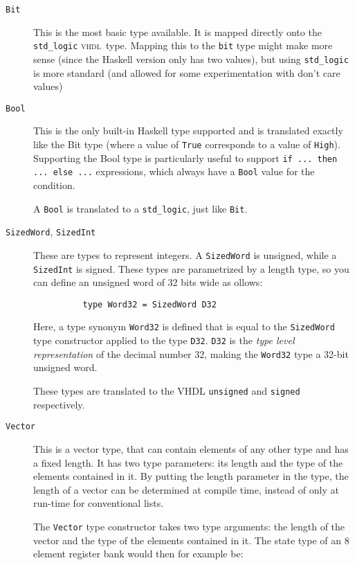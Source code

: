 \documentclass[conference,pdf,a4paper,10pt,final,twoside,twocolumn]{IEEEtran}
\def\VHDL{\textsc{vhdl}}
\def\hs#1{\texttt{#1}}
\begin{document}
    \begin{description}
      \item[\hs{Bit}]
        This is the most basic type available. It is mapped directly onto
        the \texttt{std\_logic} \VHDL\ type. Mapping this to the
        \texttt{bit} type might make more sense (since the Haskell version
        only has two values), but using \texttt{std\_logic} is more standard
        (and allowed for some experimentation with don't care values)

      \item[\hs{Bool}]
        This is the only built-in Haskell type supported and is translated
        exactly like the Bit type (where a value of \hs{True} corresponds to a
        value of \hs{High}). Supporting the Bool type is particularly
        useful to support \hs{if ... then ... else ...} expressions, which
        always have a \hs{Bool} value for the condition.

        A \hs{Bool} is translated to a \texttt{std\_logic}, just like \hs{Bit}.
      \item[\hs{SizedWord}, \hs{SizedInt}]
        These are types to represent integers. A \hs{SizedWord} is unsigned,
        while a \hs{SizedInt} is signed. These types are parametrized by a
        length type, so you can define an unsigned word of 32 bits wide as
        ollows:

        \begin{verbatim}
          type Word32 = SizedWord D32
        \end{verbatim}

        Here, a type synonym \hs{Word32} is defined that is equal to the
        \hs{SizedWord} type constructor applied to the type \hs{D32}. \hs{D32}
        is the \emph{type level representation} of the decimal number 32,
        making the \hs{Word32} type a 32-bit unsigned word.

        These types are translated to the \small{VHDL} \texttt{unsigned} and
        \texttt{signed} respectively.
      \item[\hs{Vector}]
        This is a vector type, that can contain elements of any other type and
        has a fixed length. It has two type parameters: its
        length and the type of the elements contained in it. By putting the
        length parameter in the type, the length of a vector can be determined
        at compile time, instead of only at run-time for conventional lists.

        The \hs{Vector} type constructor takes two type arguments: the length
        of the vector and the type of the elements contained in it. The state
        type of an 8 element register bank would then for example be:


\end{description}
\end{document}
